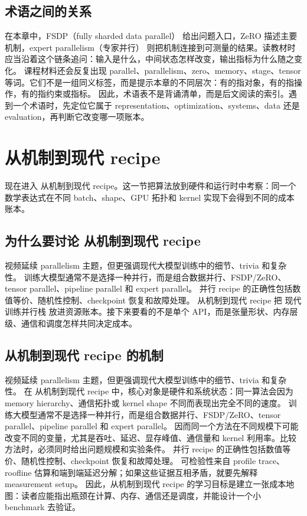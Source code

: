 \documentclass[a4paper]{article}
\begin{document}
\subsection{术语之间的关系}
在本章中，FSDP（fully sharded data parallel） 给出问题入口，ZeRO 描述主要机制，expert parallelism（专家并行） 则把机制连接到可测量的结果。读教材时应当沿着这个链条追问：输入是什么，中间状态怎样改变，输出指标为什么随之变化。
课程材料还会反复出现 parallel、parallelism、zero、memory、stage、tensor 等词。它们不是一组同义标签，而是提示本章的不同层次：有的指对象，有的指操作，有的指约束或指标。
因此，术语表不是背诵清单，而是后文阅读的索引。遇到一个术语时，先定位它属于 representation、optimization、systems、data 还是 evaluation，再判断它改变哪一项账本。
\section{从机制到现代 recipe}
现在进入 从机制到现代 recipe。这一节把算法放到硬件和运行时中考察：同一个数学表达式在不同 batch、shape、GPU 拓扑和 kernel 实现下会得到不同的成本账本。
\subsection{为什么要讨论 从机制到现代 recipe}
视频延续 parallelism 主题，但更强调现代大模型训练中的细节、trivia 和复杂性。
训练大模型通常不是选择一种并行，而是组合数据并行、FSDP/ZeRO、tensor parallel、pipeline parallel 和 expert parallel。
并行 recipe 的正确性包括数值等价、随机性控制、checkpoint 恢复和故障处理。
从机制到现代 recipe 把 现代训练并行栈 放进资源账本。接下来要看的不是单个 API，而是张量形状、内存层级、通信和调度怎样共同决定成本。
\subsection{从机制到现代 recipe 的机制}
视频延续 parallelism 主题，但更强调现代大模型训练中的细节、trivia 和复杂性。 在 从机制到现代 recipe 中，核心对象是硬件和系统状态：同一算法会因为 memory hierarchy、通信拓扑或 kernel shape 不同而表现出完全不同的速度。
训练大模型通常不是选择一种并行，而是组合数据并行、FSDP/ZeRO、tensor parallel、pipeline parallel 和 expert parallel。 因而同一个方法在不同规模下可能改变不同的变量，尤其是吞吐、延迟、显存峰值、通信量和 kernel 利用率。比较方法时，必须同时给出问题规模和实验条件。
并行 recipe 的正确性包括数值等价、随机性控制、checkpoint 恢复和故障处理。 可检验性来自 profile trace、roofline 估算和端到端延迟分解；如果这些证据互相矛盾，就要先解释 measurement setup。
因此，从机制到现代 recipe 的学习目标是建立一张成本地图：读者应能指出瓶颈在计算、内存、通信还是调度，并能设计一个小 benchmark 去验证。
\end{document}
